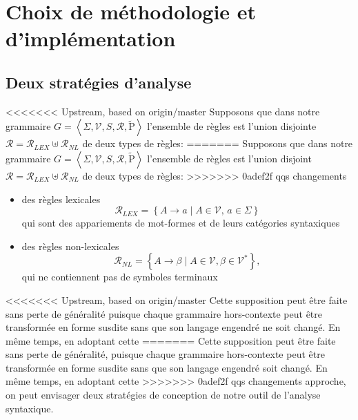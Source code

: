 \documentclass[12pt]{article}
\begin{document}
\section{Choix de m\'ethodologie et d'impl\'ementation}

\subsection{Deux strat\'egies d'analyse}

<<<<<<< Upstream, based on origin/master
Supposons que dans notre grammaire $G = \left< \Sigma, \mathscr{V}, S, \mathscr{R}, \tilde{\mathrm{P}} \right>$ l'ensemble de r\`egles est l'union disjointe $\mathscr{R} = \mathscr{R}_{LEX} \uplus \mathscr{R}_{NL}$ de deux types de r\`egles:
=======
Supposons que dans notre grammaire $G = \left< \Sigma, \mathscr{V}, S,
\mathscr{R}, \tilde{\mathrm{P}} \right>$ l'ensemble de r\`egles est l'union disjoint $\mathscr{R} = \mathscr{R}_{LEX} \uplus \mathscr{R}_{NL}$ de deux types de r\`egles:
>>>>>>> 0adef2f qqs changements
\begin{itemize}
\item des r\`egles lexicales
$$\mathscr{R}_{LEX} = \left\{ A \rightarrow a \mid
        A \in \mathscr{V}, \, a \in \Sigma \right\}$$
qui sont des appariements de mot-formes et de leurs cat\'egories syntaxiques
\item des r\`egles non-lexicales
$$\mathscr{R}_{NL} = \left\{ A \rightarrow \beta \mid
     A \in \mathscr{V}, \beta \in \mathscr{V}^* \right\},$$
qui ne contiennent pas de symboles terminaux
\end{itemize}

<<<<<<< Upstream, based on origin/master
Cette supposition peut \^etre faite sans perte de g\'en\'eralit\'e puisque
chaque grammaire hors-contexte peut \^etre transform\'ee en forme susdite sans
que son langage engendr\'e ne soit chang\'e. En m\^eme temps, en adoptant cette
=======
Cette supposition peut \^etre faite sans perte de g\'en\'eralit\'e, puisque
chaque grammaire hors-contexte peut \^etre transform\'ee en forme susdite sans
que son langage engendr\'e soit chang\'e. En m\^eme temps, en adoptant cette
>>>>>>> 0adef2f qqs changements
approche, on peut envisager deux strat\'egies de conception de notre outil de
l'analyse syntaxique.
\end{document}
